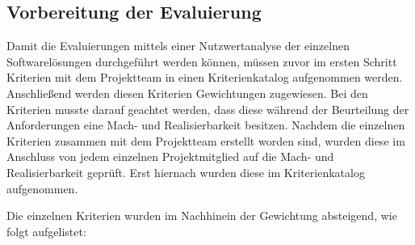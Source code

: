 \subsection{Vorbereitung der Evaluierung}
\label{subsec:vorbereiten_der_evaluierung_frontend}
Damit die Evaluierungen mittels einer Nutzwertanalyse der einzelnen
Softwarelösungen durchgeführt werden können, müssen zuvor im ersten Schritt
Kriterien mit dem Projektteam in einen Kriterienkatalog aufgenommen werden.
Anschließend werden diesen Kriterien Gewichtungen zugewiesen. Bei den Kriterien
musste darauf geachtet werden, dass diese während der Beurteilung der
Anforderungen eine Mach- und Realisierbarkeit besitzen. Nachdem die einzelnen
Kriterien zusammen mit dem Projektteam erstellt worden sind, wurden diese im
Anschluss von jedem einzelnen Projektmitglied auf die Mach- und
Realisierbarkeit geprüft. Erst hiernach wurden diese im Kriterienkatalog
aufgenommen.

Die einzelnen Kriterien wurden im Nachhinein der Gewichtung absteigend,
wie folgt aufgelistet:

